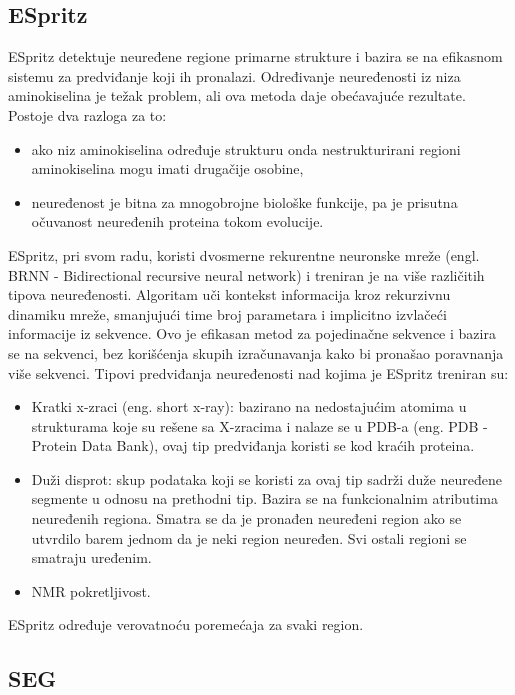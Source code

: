 \subsection{ESpritz}
ESpritz detektuje neuređene regione primarne strukture i bazira se na efikasnom sistemu za predviđanje koji ih pronalazi. Određivanje neuređenosti iz niza aminokiselina je težak problem, ali ova metoda daje obećavajuće rezultate. Postoje dva razloga za to:
\begin{itemize}
\item  ako niz aminokiselina određuje strukturu onda nestrukturirani regioni aminokiselina mogu imati drugačije osobine, 
\item neuređenost je bitna za mnogobrojne biološke funkcije, pa je prisutna očuvanost neuređenih proteina tokom evolucije. 
\end{itemize}

ESpritz, pri svom radu, koristi dvosmerne rekurentne neuronske mreže (engl. BRNN - Bidirectional recursive neural network) i treniran je na više različitih tipova neuređenosti. Algoritam uči kontekst informacija kroz rekurzivnu dinamiku mreže, smanjujući time broj parametara i implicitno izvlačeći informacije iz sekvence. Ovo je efikasan metod za pojedinačne sekvence i bazira se na sekvenci, bez korišćenja skupih izračunavanja kako bi pronašao poravnanja više sekvenci. Tipovi predviđanja neuređenosti nad kojima je ESpritz treniran su:
\begin{itemize}
\item Kratki x-zraci (eng. short x-ray): bazirano na nedostajućim atomima u strukturama koje su rešene sa X-zracima i nalaze se u PDB-a (eng. PDB - Protein Data Bank), ovaj tip predviđanja koristi se kod kraćih proteina. 
\item Duži disprot: skup podataka koji se koristi za ovaj tip sadrži duže neuređene segmente u odnosu na prethodni tip. Bazira se na funkcionalnim atributima neuređenih regiona. Smatra se da je pronađen neuređeni region ako se utvrdilo barem jednom da je neki region neuređen. Svi ostali regioni se smatraju uređenim.
\item NMR pokretljivost.
\end{itemize}
ESpritz određuje verovatnoću poremećaja za svaki region. ~\cite{ESpritzAFPD, ESpritzEP, ESpritz2, ESpritz3}



\subsection{SEG}


